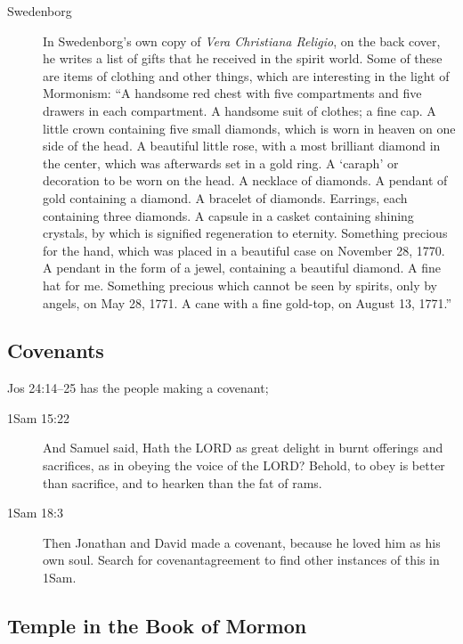 		\begin{description}
		\item[Swedenborg] In Swedenborg's own copy of \textit{Vera Christiana Religio}, on the back cover, he writes a list of gifts that he received in the spirit world. Some of these are items of clothing and other things, which are interesting in the light of Mormonism: ``A handsome red chest with five compartments and five drawers in each compartment. A handsome suit of clothes; a fine cap. A little crown containing five small diamonds, which is worn in heaven on one side of the head. A beautiful little rose, with a most brilliant diamond in the center, which was afterwards set in a gold ring. A ‘caraph' or decoration to be worn on the head. A necklace of diamonds. A pendant of gold containing a diamond. A bracelet of diamonds. Earrings, each containing three diamonds. A capsule in a casket containing shining crystals, by which is signified regeneration to eternity. Something precious for the hand, which was placed in a beautiful case on November 28, 1770. A pendant in the form of a jewel, containing a beautiful diamond. A fine hat for me. Something precious which cannot be seen by spirits, only by angels, on May 28, 1771. A cane with a fine gold-top, on August 13, 1771.''
		\end{description}

	\subsection{Covenants} %

		Jos 24:14--25 has the people making a covenant;
		
		\begin{description}
		\item[1Sam 15:22] And Samuel said, Hath the LORD as great delight in burnt offerings and sacrifices, as in obeying the voice of the LORD? Behold, to obey is better than sacrifice, and to hearken than the fat of rams.
		\item[1Sam 18:3] Then Jonathan and David made a covenant, because he loved him as his own soul. Search for covenantagreement to find other instances of this in 1Sam.
		\end{description}
		
	\subsection{Temple in the Book of Mormon} %
	
